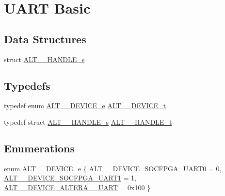 \hypertarget{group__UART__BASIC}{}\section{U\+A\+RT Basic}
\label{group__UART__BASIC}
\subsection*{Data Structures}
\begin{DoxyCompactItemize}
\item 
struct \mbox{\hyperlink{structALT__16550__HANDLE__s}{A\+L\+T\+\_\+\_\+\+H\+A\+N\+D\+L\+E\+\_\+s}}
\end{DoxyCompactItemize}
\subsection*{Typedefs}
\begin{DoxyCompactItemize}
\item 
typedef enum \mbox{\hyperlink{group__UART__BASIC_gaaba218dfc8c12ed9a1204aede9a02ee7}{A\+L\+T\+\_\+\_\+\+D\+E\+V\+I\+C\+E\+\_\+e}} \mbox{\hyperlink{group__UART__BASIC_ga292038e1b11e0a1f05df98abd20c819b}{A\+L\+T\+\_\+\_\+\+D\+E\+V\+I\+C\+E\+\_\+t}}
\item 
typedef struct \mbox{\hyperlink{structALT__16550__HANDLE__s}{A\+L\+T\+\_\+\_\+\+H\+A\+N\+D\+L\+E\+\_\+s}} \mbox{\hyperlink{group__UART__BASIC_ga4173f362f19fc04032c3859b78d78119}{A\+L\+T\+\_\+\_\+\+H\+A\+N\+D\+L\+E\+\_\+t}}
\end{DoxyCompactItemize}
\subsection*{Enumerations}
\begin{DoxyCompactItemize}
\item 
enum \mbox{\hyperlink{group__UART__BASIC_gaaba218dfc8c12ed9a1204aede9a02ee7}{A\+L\+T\+\_\+\_\+\+D\+E\+V\+I\+C\+E\+\_\+e}} \{ \mbox{\hyperlink{group__UART__BASIC_ggaaba218dfc8c12ed9a1204aede9a02ee7a7436eecedc67b129c1e89f764a67fe59}{A\+L\+T\+\_\+\_\+\+D\+E\+V\+I\+C\+E\+\_\+\+S\+O\+C\+F\+P\+G\+A\+\_\+\+U\+A\+R\+T0}} = 0, 
\mbox{\hyperlink{group__UART__BASIC_ggaaba218dfc8c12ed9a1204aede9a02ee7a318b1dfcd2b5a71bed69289443b26167}{A\+L\+T\+\_\+\_\+\+D\+E\+V\+I\+C\+E\+\_\+\+S\+O\+C\+F\+P\+G\+A\+\_\+\+U\+A\+R\+T1}} = 1, 
\mbox{\hyperlink{group__UART__BASIC_ggaaba218dfc8c12ed9a1204aede9a02ee7ad8f6514887982ca58cec90ebee879abe}{A\+L\+T\+\_\+\_\+\+D\+E\+V\+I\+C\+E\+\_\+\+A\+L\+T\+E\+R\+A\+\_\+\_\+\+U\+A\+RT}} = 0x100
 \}
\end{DoxyCompactItemize}
